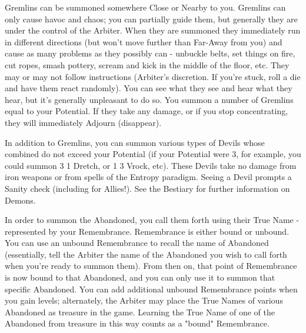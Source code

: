   Gremlins can be summoned somewhere Close or Nearby to  you.  Gremlins can only cause havoc and chaos; you can partially guide them, but generally they are under the control of the Arbiter.  When they are summoned they immediately run in different directions (but won't move further than Far-Away from you) and cause as many problems as they possibly can - unbuckle belts, set things on fire, cut ropes, smash pottery, scream and kick in the middle of the floor, etc.  They may or may not follow instructions (Arbiter's discretion.  If you're stuck, roll a die and have them react randomly).  You can see what they see and hear what they hear, but it's generally unpleasant to do so.  You summon a number of Gremlins equal to your Potential.  If they take any damage, or if you stop concentrating, they will immediately Adjourn (disappear).

  In addition to Gremlins, you can summon various types of Devils whose combined \HD do not exceed your Potential (if your Potential were 3, for example, you could summon 3 1 \HD Dretch, or 1 3 \HD Vrock, etc).  These Devils take no damage from iron weapons or from spells   of the Entropy paradigm. Seeing a Devil prompts a Sanity check (including for Allies!).  See the Bestiary for further information on Demons.


\cbreak


In order to summon the Abandoned, you call them forth using their True Name - represented by your Remembrance.  Remembrance is either bound or unbound.  You can use an unbound Remembrance to recall the name of  Abandoned (essentially, tell the Arbiter the name of the Abandoned you wish to call forth when you're ready to summon them).  From then on, that point of Remembrance is now bound to that Abandoned, and you can only use it to summon that specific Abandoned. You can add additional unbound Remembrance points when you gain levels; alternately, the Arbiter may place the True Names of various Abandoned as treasure in the game.  Learning the True Name of one of the Abandoned from treasure in this way counts as a "bound" Remembrance.

